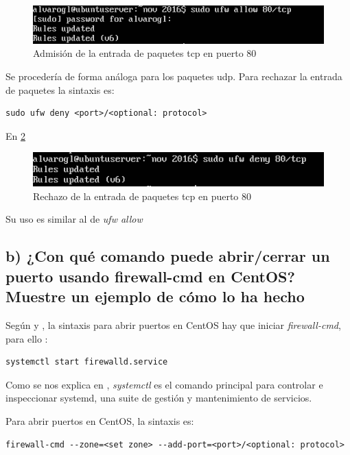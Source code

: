 \begin{figure}[H]
	\centering
	\includegraphics[scale=0.6]{ise4.png}
	\caption{Admisión de la entrada de paquetes tcp en puerto 80} \label{ise4}
\end{figure}

Se procedería de forma análoga para los paquetes udp.
Para rechazar la entrada de paquetes la sintaxis es:

\begin{verbatim}
sudo ufw deny <port>/<optional: protocol>
\end{verbatim}

En \ref{ise5}

\begin{figure}[H]
	\centering
	\includegraphics[scale=0.6]{ise5.png}
	\caption{Rechazo de la entrada de paquetes tcp en puerto 80} \label{ise5}
\end{figure}

Su uso es similar al de \textit{ufw allow}

\subsection{b) ¿Con qué comando puede abrir/cerrar un puerto usando firewall-cmd en CentOS? Muestre un ejemplo de cómo lo ha hecho}

Según \cite{firewall-cmd} y \cite{firewall-cmd2}, la sintaxis para abrir puertos en CentOS hay que iniciar \textit{firewall-cmd}, para ello \cite{systemd}:

\begin{verbatim}
systemctl start firewalld.service
\end{verbatim}

Como se nos explica en \cite{systemd}, \textit{systemctl} es el comando principal para controlar e inspeccionar systemd, una suite de gestión y mantenimiento de servicios.

Para abrir puertos en CentOS, la sintaxis es:

\begin{verbatim}
firewall-cmd --zone=<set zone> --add-port=<port>/<optional: protocol>
\end{verbatim}


